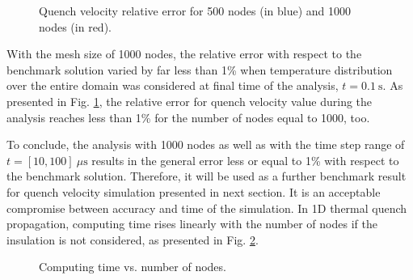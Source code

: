 \begin{figure}[h!]
\centering
    \caption{Quench velocity relative error for 500 nodes (in blue) and 1000 nodes (in red).}
    \label{fig: q_vel_modelling_v_quench_rel_error_no_insulation}
\end{figure}

With the mesh size of 1000 nodes, the relative error with respect to the benchmark solution varied by far less than 1\% when temperature distribution over the entire domain was considered at final time of the analysis, $t = 0.1~\text{s}$. As presented in Fig. \ref{fig: q_vel_modelling_v_quench_rel_error_no_insulation}, the relative error for quench velocity value during the analysis reaches less than 1\% for the number of nodes equal to 1000, too. 

To conclude, the analysis with 1000 nodes as well as with the time step range of $t=[10, 100]~\mu \text{s}$ results in the general error less or equal to 1\% with respect to the benchmark solution. Therefore, it will be used as a further benchmark result for quench velocity simulation presented in next section. It is an acceptable compromise between  accuracy and time of the simulation. In 1D thermal quench propagation, computing time rises linearly with the number of nodes if the insulation is not considered, as presented in Fig. \ref{fig: q_vel_modelling_heat_balance_computing_time_no_insulation}.

\begin{figure}[h!]
\centering
    \caption{Computing time vs. number of nodes.}
    \label{fig: q_vel_modelling_heat_balance_computing_time_no_insulation}
\end{figure}
